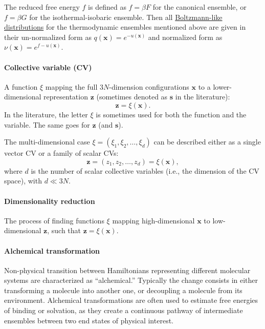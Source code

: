 \documentclass[9pt,review]{livecoms}
\newcommand{\vx}{\mathbf{x}}
\newcommand{\vz}{\mathbf{z}}
\begin{document}
The reduced free energy $f$ is defined as $f = \beta F$ for the canonical ensemble,
or $f = \beta G$ for the isothermal-isobaric ensemble.
Then all \hyperlink{ref:Distribution} {Boltzmann-like distributions} for the thermodynamic ensembles mentioned above are given in their un-normalized form as $q(\vx) = e^{-u(\vx)}$ and normalized form as
  $\nu(\vx) = e^{f-u(\vx)}$.


\hypertarget{ref:CV}{\paragraph{Collective variable (CV)}} A function $\xi$ mapping the full $3N$-dimension configurations $\vx$ to a lower-dimensional representation $\vz$ (sometimes denoted as $\mathbf{s}$ in the literature):
\begin{equation}
\vz = \xi(\vx).
\end{equation}
In the literature, the letter $\xi$ is sometimes used for both the function and the variable. The same goes for $\vz$ (and $\mathbf{s}$).

The multi-dimensional case $\xi= (\xi_1,\xi_2,\ldots,\xi_d)$ can be described either as a single vector CV or a family of scalar CVs:
\begin{equation}
\vz = (z_1, z_2, \ldots, z_d) = \xi(\vx),
\end{equation}
where $d$ is the number of scalar collective variables (i.e., the dimension of the CV space), with $d\ll 3N$.


\hypertarget{ref:DimRed} {\paragraph{Dimensionality reduction}}
The process of finding functions $\xi$ mapping high-dimensional $\vx$ to low-dimensional $\vz$, such that $\vz = \xi(\vx)$.

\hypertarget{ref:Alchemical} {\paragraph{Alchemical transformation}}
Non-physical transition between Hamiltonians representing different molecular systems are characterized as ``alchemical.'' Typically the change consists in either transforming a molecule into another one, or decoupling a molecule from its environment. Alchemical transformations are often used to estimate free energies of binding or solvation, as they create a continuous pathway of intermediate ensembles between two end states of physical interest.
\end{document}
